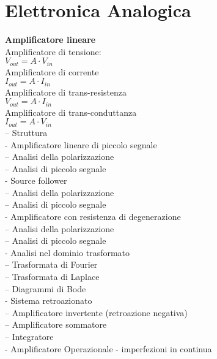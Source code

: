 \documentclass{article}
\begin{document}
\section*{Elettronica Analogica}
\textbf{Amplificatore lineare}\\
\hspace*{1cm} Amplificatore di tensione:\\
\hspace*{2cm} $V_{out} = A \cdot V_{in}$\\
\hspace*{1cm} Amplificatore di corrente\\
\hspace*{2cm} $I_{out} = A \cdot I_{in}$\\
\hspace*{1cm} Amplificatore di trans-resistenza\\
\hspace*{2cm} $V_{out} = A \cdot I_{in}$\\
\hspace*{1cm} Amplificatore di trans-conduttanza\\
\hspace*{2cm} $I_{out} = A \cdot V_{in}$\\
-- Struttura\\
- Amplificatore lineare di piccolo segnale\\
-- Analisi della polarizzazione\\
-- Analisi di piccolo segnale\\
- Source follower\\
-- Analisi della polarizzazione\\
-- Analisi di piccolo segnale\\
- Amplificatore con resistenza di degenerazione\\
-- Analisi della polarizzazione\\
-- Analisi di piccolo segnale\\
- Analisi nel dominio trasformato\\
-- Trasformata di Fourier\\
-- Trasformata di Laplace\\
-- Diagrammi di Bode\\
- Sistema retroazionato\\
-- Amplificatore invertente (retroazione negativa)\\
-- Amplificatore sommatore\\
-- Integratore\\
- Amplificatore Operazionale - imperfezioni in continua\\
\end{document}
